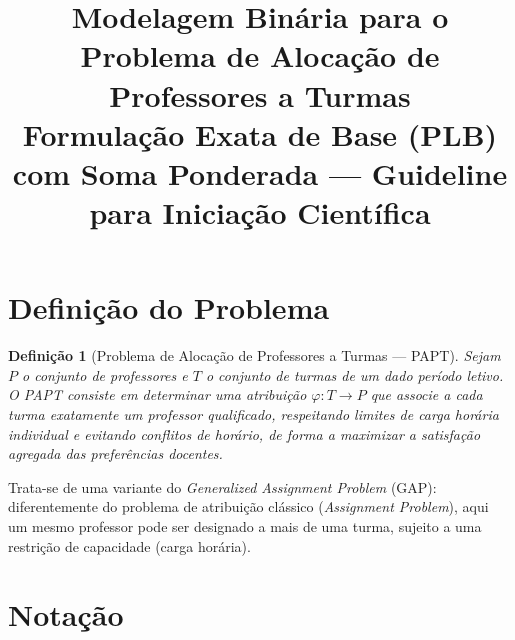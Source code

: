 \documentclass[11pt,a4paper]{article}
\title{Modelagem Binária para o Problema de Alocação de Professores a Turmas\\
\large Formulação Exata de Base (PLB) com Soma Ponderada --- Guideline para Iniciação Científica}
\author{}
\date{}
\newtheorem{definicao}{Definição}
\begin{document}
\maketitle

\section{Definição do Problema}

\begin{definicao}[Problema de Alocação de Professores a Turmas --- PAPT]
Sejam $P$ o conjunto de professores e $T$ o conjunto de turmas de um dado período letivo. O PAPT consiste em determinar uma atribuição $\varphi: T \rightarrow P$ que associe a cada turma exatamente um professor qualificado, respeitando limites de carga horária individual e evitando conflitos de horário, de forma a maximizar a satisfação agregada das preferências docentes.
\end{definicao}

Trata-se de uma variante do \emph{Generalized Assignment Problem} (GAP): diferentemente do problema de atribuição clássico (\emph{Assignment Problem}), aqui um mesmo professor pode ser designado a mais de uma turma, sujeito a uma restrição de capacidade (carga horária). 

\section{Notação}
\end{document}

